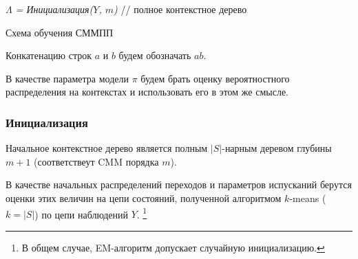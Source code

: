 \documentclass{matmex-diploma-custom}
\begin{document}
\begin{algorithm}[H]
 \textit{
 $\Lambda$ = Инициализация($Y$, $m$)
 }\;
 // полное контекстное дерево\\
 \caption{Схема обучения СММПП}
 \label{alg}
\end{algorithm}

Конкатенацию строк $a$ и $b$ будем обозначать $ab$.

В качестве параметра модели $\pi$ будем брать оценку вероятностного распределения на контекстах и использовать его в этом же смысле.

\subsubsection{Инициализация}
Начальное контекстное дерево является полным $|S|$-нарным деревом глубины $m+1$ (соответствеут CMM порядка $m$).

В качестве начальных распределений переходов и параметров испусканий берутся оценки этих величин на цепи состояний, полученной алгоритмом $k$-means ($k=|S|$) по цепи наблюдений $Y$. \footnote{В общем случае, EM-алгоритм допускает случайную инициализацию.}
\end{document}
